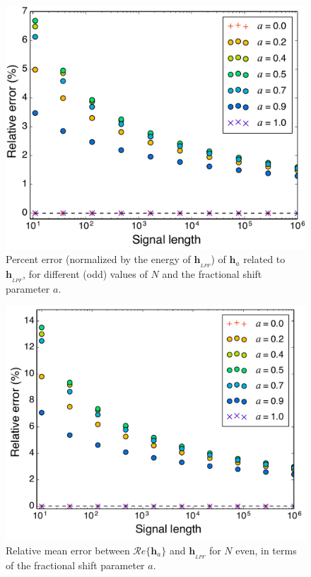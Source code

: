 \begin{figure}[ht!]
	\centering
	\includegraphics[width=0.81\linewidth]{Figures/convergence_odd_N_V4.pdf}
	\caption{Percent error (normalized by the energy of $ \mathbf{h}_{_{LPF}} $) of $ \mathbf{h}_a $ related to $ \mathbf{h}_{_{LPF}} $, for different (odd) values of $ N $ and the fractional shift parameter $ a $.}
	\label{fig:convergence}
\end{figure}

\begin{figure}[ht!]
	\centering
	\includegraphics[width=0.81\linewidth]{Figures/convergence_even_N_real_part.pdf}
	\caption{Relative mean error between $ \mathcal{R}e\{\mathbf{h}_a\} $ and $ \mathbf{h}_{_{LPF}} $ for $ N $ even, in terms of the fractional shift parameter $a$.}
	\label{fig:convergence_even_N_real_part}
\end{figure}

